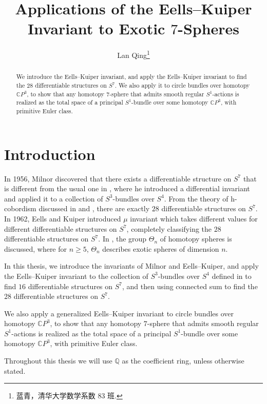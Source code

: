 \documentclass[twoside]{article}
\begin{document}
\title{Applications of the Eells--Kuiper Invariant to Exotic $7$-Spheres}
\author{Lan Qing\footnote{蓝青，清华大学数学系数 83 班.}}

\begin{abstract}
	We introduce the Eells--Kuiper invariant, and apply the Eells--Kuiper invariant to find the $28$ differentiable structures on $S^7$. We also apply it to circle bundles over homotopy $\mathbb{C}P^3$, to show that any homotopy $7$-sphere that admits smooth regular $S^1$-actions
	is realized as the total space of a principal $S^1$-bundle over some homotopy $\mathbb{C}P^3$, with primitive Euler class. 
\end{abstract}

\tableofcontents

\section{Introduction}

In 1956, Milnor discovered that there exists a differentiable structure on $S^7$ that is different from the usual one in \cite{milnor7sphere}, where he introduced a differential  invariant and applied it to a collection of $S^3$-bundles over $S^4$. From the theory of h-cobordism discussed in \cite{milnor3} and \cite{smale}, there are exactly $28$ differentiable structures on $S^7$. In 1962, Eells and Kuiper introduced $\mu$ invariant which takes different values for different differentiable structures on $S^7$, completely classifying the $28$ differentiable structures on $S^7$. 
In \cite{kervairemilnor}, the group $\Theta_n$ of homotopy spheres is discussed, where for  $n \geq  5$, $\Theta_n$ describes exotic spheres of dimension $n$. 

In this thesis, we introduce the invariants of Milnor and Eells--Kuiper, and apply the Eells--Kuiper invariant to the collection of $S^3$-bundles over $S^4$ defined in \cite{milnor7sphere} to find $16$ differentiable structures on $S^7$, and then using connected sum to find the $28$ differentiable structures on $S^7$. 

We also apply a generalized Eells--Kuiper invariant to circle bundles over homotopy $\mathbb{C}P^3$, to show that any homotopy $7$-sphere that admits smooth regular $S^1$-actions
is realized as the total space of a principal $S^1$-bundle over some homotopy $\mathbb{C}P^3$, with primitive Euler class. 

Throughout this thesis we will use $\mathbb{Q}$ as the coefficient ring, unless otherwise stated. 
\end{document}
